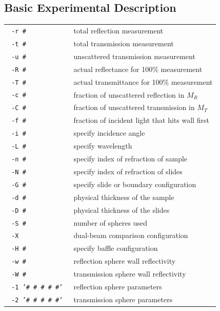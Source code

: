 \documentclass{article}
\begin{document}
\subsection{Basic Experimental Description}

\begin{center}
\begin{tabular}{lp{7cm}}
\texttt{ -r \#               }& total reflection measurement               \\
\texttt{ -t \#               }& total transmission measurement             \\
\texttt{ -u \#               }& unscattered transmission measurement       \\[3mm]
\texttt{ -R \#               }& actual reflectance for 100\% measurement   \\
\texttt{ -T \#               }& actual transmittance for 100\% measurement \\
\texttt{ -c \#               }& fraction of unscattered reflection in $M_R$\\
\texttt{ -C \#               }& fraction of unscattered transmission in $M_T$\\
\texttt{ -f \#               }& fraction of incident light that hits wall first\\[3mm]
\texttt{ -i \#               }& specify incidence angle                    \\
\texttt{ -L \#               }& specify wavelength                         \\
\texttt{ -n \#               }& specify index of refraction of sample      \\
\texttt{ -N \#               }& specify index of refraction of slides      \\
\texttt{ -G \#               }& specify slide or boundary configuration    \\
\texttt{ -d \#               }& physical thickness of the sample           \\
\texttt{ -D \#               }& physical thickness of the slides           \\
\texttt{ -S \#               }& number of spheres used                     \\
\texttt{ -X                  }& dual-beam comparison configuration         \\
\texttt{ -H \#               }& specify baffle configuration               \\
\texttt{ -w \#               }& reflection sphere wall reflectivity        \\
\texttt{ -W \#               }& transmission sphere wall reflectivity      \\
\texttt{ -1 '\# \# \# \# \#' }& reflection sphere parameters               \\
\texttt{ -2 '\# \# \# \# \#' }& transmission sphere parameters             \\
\end{tabular}
\end{center}
\end{document}
